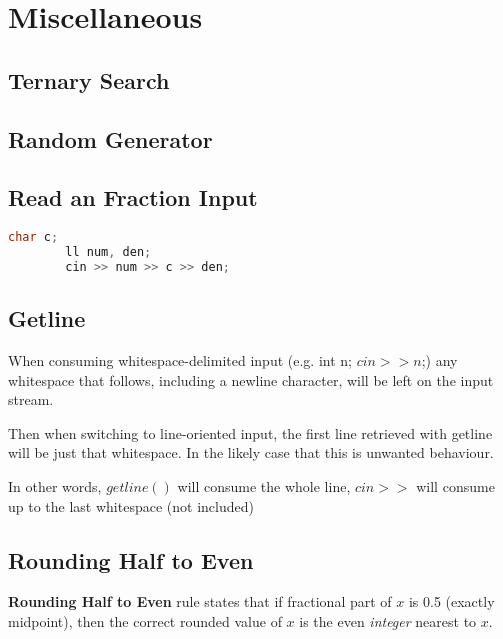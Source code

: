 \chapter{Miscellaneous}

\section{Ternary Search}


\section{Random Generator}


\section{Read an Fraction Input}

    \begin{lstlisting}[language=c++]
        char c;
        ll num, den;
        cin >> num >> c >> den;
    \end{lstlisting}

\section{Getline}

    When consuming whitespace-delimited input (e.g. int n; $cin >> n$;) any whitespace that follows, 
    including a newline character, will be left on the input stream. 

    Then when switching to line-oriented input, the first line retrieved with getline will be just that whitespace. In the likely case that this is unwanted behaviour.

    In other words, $getline()$ will consume the whole line, $cin>>$ will consume up to the last whitespace (not included) 


\section{Rounding Half to Even}

    \textbf{Rounding Half to Even} rule states that 
    if fractional part of $x$ is 0.5 (exactly midpoint), then the correct rounded value of $x$ is the even \textit{integer} nearest to $x$.

